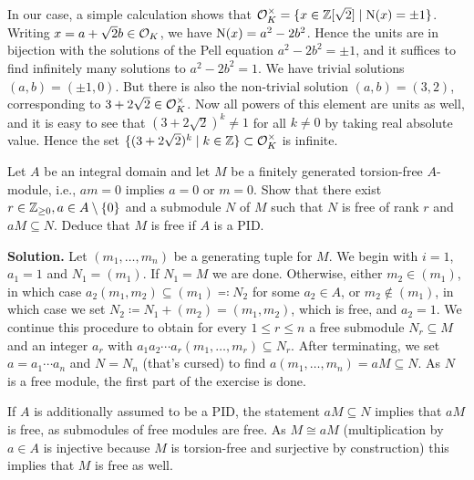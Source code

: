 \documentclass[a4paper,11pt]{article}
\begin{document}
In our case, a simple calculation shows that $\mathcal{O}_K^\times = \{x \in 
\mathbb{Z}[\sqrt 2] \mid \operatorname{N}(x) = \pm 1\}$. Writing $x = a + \sqrt 2 b \in \mathcal{O}_K$, we have
$\operatorname{N}(x) = a^2 - 2b^2$. Hence the units are in bijection with the solutions of
the Pell equation $a^2 - 2b^2 = \pm 1$, and it suffices to find infinitely many 
solutions to $a^2 - 2b^2 = 1$. We have trivial solutions $(a,b) = (\pm 1, 0)$.
But there is also the non-trivial solution $(a,b) = (3,2)$, corresponding to
$3 + 2 \sqrt 2 \in \mathcal{O}_K^\times$. Now all powers of this element are units as well, 
and it is easy to see that $(3 + 2\sqrt 2)^k \neq 
1$ for all $k \neq 0$ by taking real absolute value. Hence  the 
set $\{(3+2 \sqrt 2)^k \mid k \in \mathbb{Z}\} \subset \mathcal{O}_K^\times$ is infinite.


Let $A$ be an integral domain and let $M$ be a finitely generated torsion-free
$A$-module, i.e., $am = 0$ implies $a = 0$ or $m = 0$. Show that there exist $r
\in \mathbb{Z}_{\geq 0}, a \in A\setminus \{0\}$ and a submodule $N$ of $M$ such that
$N$ is free of rank $r$ and $aM \subseteq N$. Deduce that $M$ is free if $A$ is
a PID.

\textbf{Solution.} Let $(m_1, \dots, m_n)$ be a generating tuple for $M$. We begin
with $i = 1$, $a_1 = 1$ and $N_1 = (m_1)$. If $N_1 = M$ we are done.
Otherwise, either $m_2 \in (m_1)$, in which
case $a_2(m_1, m_2) \subseteq (m_1) \eqqcolon N_2$ for some $a_2 \in A$, or $m_2
\not \in (m_1)$, in which case we set $N_2 \coloneqq N_1 + (m_2) = (m_1, m_2)$, which
is free, and $a_2 = 1$. We continue this procedure to obtain
for every $1 \leq r \leq n$ a free submodule $N_r \subseteq M$ and an integer $a_r$
with $a_1a_2 \cdots a_r (m_1, \dots, m_r) \subseteq N_r$. After terminating, we set 
$a = a_1 \cdots a_n$ and $N = N_n$ (that's cursed) to find $a(m_1,
\dots, m_n) = aM \subseteq N$. As $N$ is a free module, the first part of the
exercise is done. 

If $A$ is additionally assumed to be a PID, the statement $aM \subseteq N$
implies that $aM$ is free, as submodules of free modules are free. As $M \cong
aM$ (multiplication by $a \in A$ is injective because $M$ is torsion-free and
surjective by construction) this implies that $M$ is free as well.


\contactend
\end{document}
